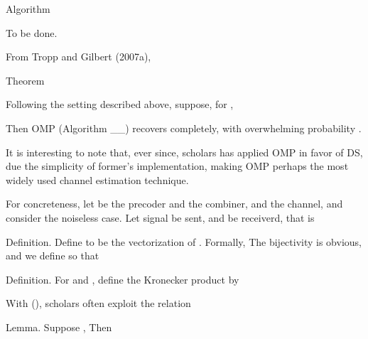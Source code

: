 \Result
{Algorithm}
{
\startitemize[n]
\item To be done.
\stopitemize
}

From Tropp and Gilbert (2007a),

\Result
{Theorem}
{
Following the setting described above, suppose, for ,


Then OMP (Algorithm \_\_) recovers  completely, with overwhelming probability .
}

It is interesting to note that, ever since, scholars has applied OMP in favor of DS, due the simplicity of former's implementation, making OMP perhaps the most widely used channel estimation technique.

\stopsection
\startsection [title={OMP used in Channel Sensing}]

For concreteness, let  be the precoder and  the combiner, and  the channel, and consider the noiseless case.
Let signal  be sent, and  be receiverd, that is


\Result
{Definition.}
{
Define  to be the vectorization of .
Formally,
The bijectivity is obvious, and we define  so that
}

\Result
{Definition.}
{
For  and , define the Kronecker product  by
}

With (), scholars often exploit the relation

\Result
{Lemma.}
{
Suppose ,
Then
}

